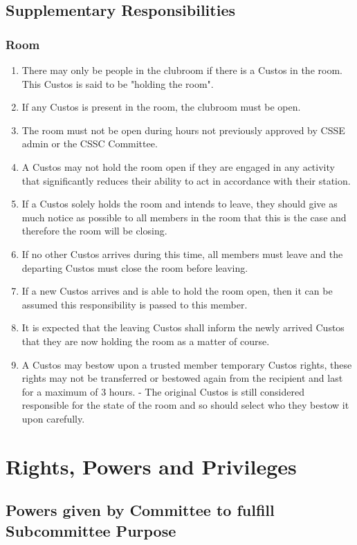 \documentclass[10pt,a4paper]{report}
\begin{document}
		\section{Supplementary Responsibilities}
			\subsection{Room}
			\begin{enumerate}
				\item There may only be people in the clubroom if there is a Custos in the room. This Custos is said to be "holding the room".
				\item If any Custos is present in the room, the clubroom must be open.
				\item The room must not be open during hours not previously approved by CSSE admin or the CSSC Committee.
				\item A Custos may not hold the room open if they are engaged in any activity that significantly reduces their ability to act in accordance with their station.
				\item If a Custos solely holds the room and intends to leave, they should give as much notice as possible to all members in the room that this is the case and therefore the room will be closing.
				\item If no other Custos arrives during this time, all members must leave and the departing Custos must close the room before leaving.
				\item If a new Custos arrives and is able to hold the room open, then it can be assumed this responsibility is passed to this member.
				\item It is expected that the leaving Custos shall inform the newly arrived Custos that they are now holding the room as a matter of course.
				\item A Custos may bestow upon a trusted member temporary Custos rights, these rights may not be transferred or bestowed again from the recipient and last for a maximum of 3 hours. - The original Custos is still considered responsible for the state of the room and so should select who they bestow it upon carefully.
			\end{enumerate}
			
	\chapter{Rights, Powers and Privileges}
		\section{Powers given by Committee to fulfill Subcommittee Purpose}
		
\end{document}
